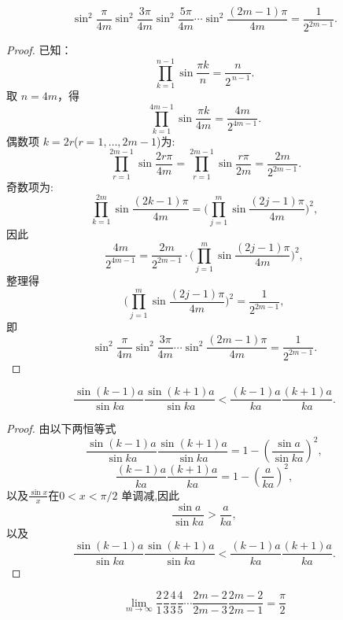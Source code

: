 \begin{lemma}\label{lem:Stirling-2}
    $$\sin^2\frac{\pi}{4m}\sin^2\frac{3\pi}{4m}\sin^2\frac{5\pi}{4m}\cdots\sin^2\frac{(2m-1)\pi}{4m} = \frac{1}{2^{2m-1}}.$$
\end{lemma}

\begin{proof}
    已知：$$
        \prod_{k=1}^{n-1}\sin\frac{\pi k}{n}=\frac{n}{2^{\,n-1}}.$$
    取 \(n=4m\)，得
    \[
        \prod_{k=1}^{4m-1}\sin\frac{\pi k}{4m}=\frac{4m}{2^{4m-1}}.
    \]
    偶数项 \(k=2r\)(\(r=1,\dots,2m-1\))为:
    \[
        \prod_{r=1}^{2m-1}\sin\frac{2r\pi}{4m}
        =\prod_{r=1}^{2m-1}\sin\frac{r\pi}{2m}
        =\frac{2m}{2^{2m-1}}.
    \]
    奇数项为:
    \[
        \prod_{k=1}^{2m}\sin\frac{(2k-1) \pi}{4m}
        =\Bigg(\prod_{j=1}^{m}\sin\frac{(2j-1)\pi}{4m}\Bigg)^2,
    \]
    因此
    \[
        \frac{4m}{2^{4m-1}}
        =\frac{2m}{2^{2m-1}}\cdot
        \Bigg(\prod_{j=1}^{m}\sin\frac{(2j-1)\pi}{4m}\Bigg)^2,
    \]
    整理得
    \[
        \Bigg(\prod_{j=1}^{m}\sin\frac{(2j-1)\pi}{4m}\Bigg)^2
        =\frac{1}{2^{2m-1}},
    \]
    即
    \[
        \sin^2\frac{\pi}{4m}\sin^2\frac{3\pi}{4m}\cdots\sin^2\frac{(2m-1)\pi}{4m}
        =\frac{1}{2^{2m-1}}.
    \]
\end{proof}

\begin{lemma}\label{lem:Stirling-3}
    $$\frac{\sin (k-1)a}{\sin ka}\frac{\sin (k+1)a}{\sin ka} < \frac{(k-1)a}{ka}\frac{(k+1)a}{ka}.$$
\end{lemma}

\begin{proof}
    由以下两恒等式
    $$\frac{\sin (k-1)a}{\sin ka}\frac{\sin (k+1)a}{\sin ka} = 1-\left(\frac{\sin a}{\sin ka}\right)^2, $$
    $$\frac{(k-1)a}{ka}\frac{(k+1)a}{ka} = 1-\left(\frac{a}{ka}\right)^2, $$
    以及$\frac{\sin x}{x}$在$0 < x < \pi/2$ 单调减,因此$$
        \frac{\sin a}{\sin ka} > \frac{a}{ka}, $$
    以及
    $$\frac{\sin (k-1)a}{\sin ka}\frac{\sin (k+1)a}{\sin ka} < \frac{(k-1)a}{ka}\frac{(k+1)a}{ka}.$$
\end{proof}

\begin{lemma}[Wallis 公式]\label{lem:Stirling-4}
    $$\lim_{m \to \infty} \frac{2}{1}\frac{2}{3}\frac{4}{3}\frac{4}{5}\cdots\frac{2m-2}{2m-3}\frac{2m-2}{2m-1} = \frac{\pi}{2}$$
\end{lemma}


